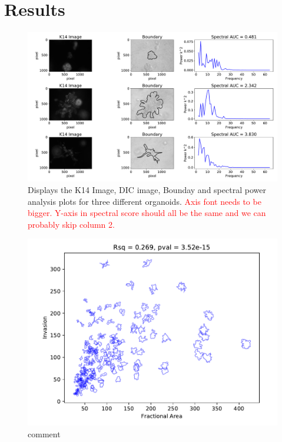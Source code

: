 \documentclass[10pt,letterpaper]{article}
\begin{document}
\section*{Results}

\begin{figure}[!h]
\includegraphics[width=\textwidth]{Image1.pdf}
\caption{Displays the K14 Image, DIC image, Bounday and spectral power analysis plots for three different organoids. \textcolor{red}{Axis font needs to be bigger. Y-axis in spectral score should all be the same and we can probably skip column 2.}} 
\label{fig1}
\end{figure}


\begin{figure}[!h]
\centering
\includegraphics[width=\textwidth]{docs/01_paper/mouse_1_Day5_FA.pdf}
\caption{comment} 
\label{fig2}
\end{figure}
\end{document}
